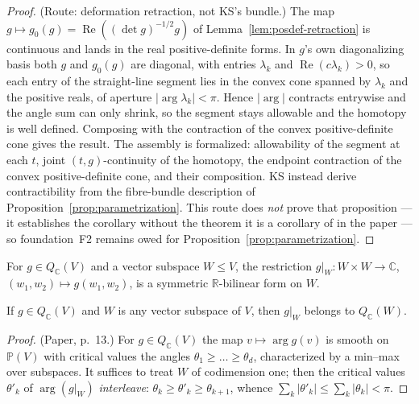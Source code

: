 \begin{proof}
  \leanok
  (Route: deformation retraction, not KS's bundle.) The map
  $g \mapsto g_0(g) = \operatorname{Re}((\det g)^{-1/2} g)$ of
  Lemma~\ref{lem:posdef-retraction} is continuous and lands in the real positive-definite
  forms. In $g$'s own diagonalizing basis both $g$ and $g_0(g)$ are diagonal, with entries
  $\lambda_k$ and $\operatorname{Re}(c\lambda_k) > 0$, so each entry of the straight-line
  segment lies in the convex cone spanned by $\lambda_k$ and the positive reals, of aperture
  $|\arg \lambda_k| < \pi$. Hence $|\arg|$ contracts entrywise and the angle sum can only
  shrink, so the segment stays allowable and the homotopy is well defined. Composing with the
  contraction of the convex positive-definite cone gives the result. The assembly is formalized: allowability of the segment at each $t$, joint
  $(t,g)$-continuity of the homotopy, the endpoint contraction of the convex
  positive-definite cone, and their composition. KS instead derive contractibility from
  the fibre-bundle description of Proposition~\ref{prop:parametrization}. This route does
  \emph{not} prove that proposition --- it establishes the corollary without the theorem
  it is a corollary of in the paper --- so foundation~F2 remains owed for
  Proposition~\ref{prop:parametrization}.
\end{proof}

\begin{definition}
  \label{def:restrict-form}
  \leanok
  For $g \in Q_{\mathbb C}(V)$ and a vector subspace $W \leq V$, the
  restriction $g|_W \colon W \times W \to \mathbb C$,
  $(w_1, w_2) \mapsto g(w_1, w_2)$, is a symmetric $\mathbb R$-bilinear
  form on $W$.
\end{definition}

\begin{proposition}
  \label{prop:restriction}
  \leanok
  If $g \in Q_{\mathbb C}(V)$ and $W$ is any vector subspace of $V$, then
  $g|_W$ belongs to $Q_{\mathbb C}(W)$.
\end{proposition}

\begin{proof}
  \leanok
  (Paper, p.~13.) For $g \in Q_{\mathbb C}(V)$ the map
  $v \mapsto \arg g(v)$ is smooth on $\mathbb P(V)$ with critical values the
  angles $\theta_1 \geq \dots \geq \theta_d$, characterized by a min--max
  over subspaces. It suffices to treat $W$ of codimension one; then the
  critical values $\theta'_k$ of $\arg(g|_W)$ \emph{interleave}:
  $\theta_k \geq \theta'_k \geq \theta_{k+1}$, whence
  $\sum_k |\theta'_k| \leq \sum_k |\theta_k| < \pi$.
\end{proof}

